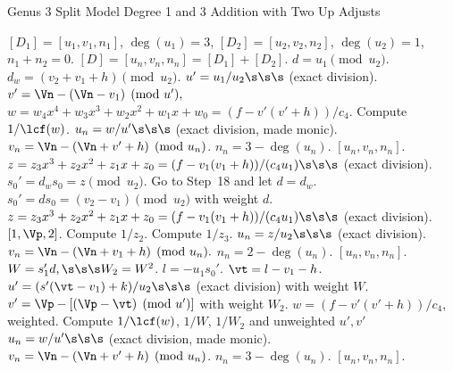 \begin{algorithm}[H]
\caption{Genus 3 Split Model Degree 1 and 3 Addition with Two Up Adjusts\label{alg:g3explSPLIT13ADDUP2}}
\begin{algorithmic} [1]
\Require $[D_1] = [u_1,v_1,n_1]$, $\deg(u_1) = 3$, $[D_2] = [u_2,v_2,n_2]$, $\deg(u_2) = 1$, $n_1 + n_2 = 0$.
\Ensure $[D] = [u_n,v_n,n_n] = [D_1] + [D_2] $.
\algrule
\vspace{-2pt}
\State $d = u_1 \pmod{u_2}$.
    \State $d_w = (v_2 + v_1 + h) \pmod{u_2}$.
        \State $u' = u_1/u_2 \s\s\s$ (exact division).
        \State $v' = \Vn - (\Vn - v_1) \pmod{u'},$
        \State $w = w_4x^4 + w_3x^3 + w_2x^2 +w_1x + w_0 = (f - v'(v' + h))/c_4$.
        \State Compute $1/\lcf(w)$.
        \State $u_n = w/u' \s\s\s$ (exact division, made monic).
        \State $v_n = \Vn - (\Vn + v' + h) \pmod{u_n}$.
        \State $n_n = 3 - \deg(u_n)$.
        \State \Return $[u_n,v_n,n_n]$.
    \EndIf
    \State $z = z_3x^3 + z_2x^2 + z_1x + z_0 = (f - v_1(v_1 + h))/(c_4u_1) \s\s\s$ (exact division).  
    \State $s_0' = d_ws_0 = z \pmod{u_2}$.
    \State Go to Step~18 and let $d = d_w$.
\EndIf
\State $s_0' = ds_0 = (v_2 - v_1) \pmod{u_2}$ with weight $d$.
\State $z = z_3x^3 + z_2x^2 + z_1x + z_0 = (f - v_1(v_1 + h))/(c_4u_1) \s\s\s$ (exact division).  
         \Return $[1,\Vp,2]$.
        \Else \hspace{3pt} Compute $1/z_2$.
        \EndIf
    \Else \hspace{3pt} Compute $1/z_3$.
    \EndIf
    \State $u_n = z/u_2 \s\s\s$ (exact division).
    \State $v_n = \Vn - (\Vn + v_1 + h) \pmod{u_n}.$
    \State $n_n = 2 - \deg(u_n)$.
    \State \Return $[u_n,v_n,n_n]$.
\EndIf
\State $W = s_1'd, \s\s\s W_2 = W^2$.
\State $l = -u_1s_0'$.
\State $\vt = l - v_1 - h$.
\State $u' = (s'(\vt - v_1) + k)/u_2 \s\s\s$ (exact division) with weight $W$.
\State $v' = \Vp - [(\Vp - \vt) \pmod{u'}]$  with weight $W_2$.
\State $w = (f - v'(v' + h))/c_4$, weighted.
\State Compute $1/\lcf(w)$, $1/W$, $1/W_2$ and unweighted $u',v'$
\State $u_n = w/u' \s\s\s$ (exact division, made monic).
\State $v_n = \Vn - (\Vn + v' + h) \pmod{u_n}$.
\State $n_n = 3 - \deg(u_n)$.
\State \Return $[u_n,v_n,n_n]$.
\vspace{-2pt}
\end{algorithmic}
\end{algorithm}

\newpage

